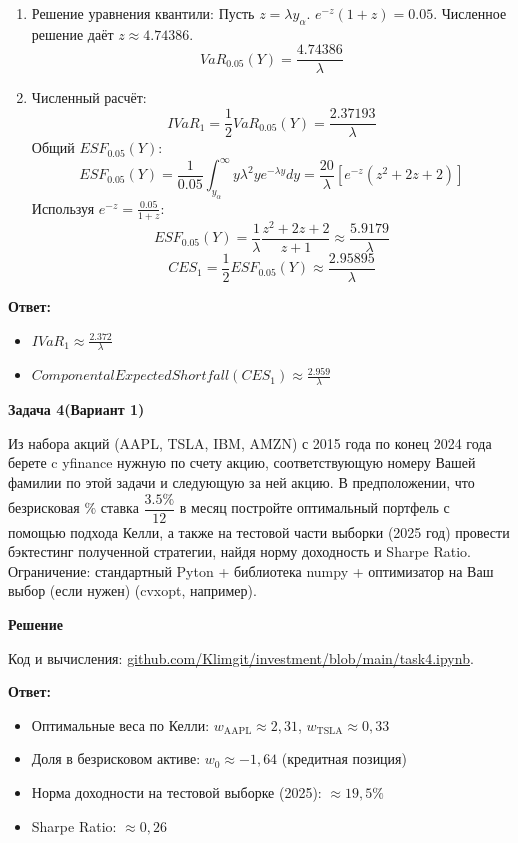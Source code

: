 \documentclass[a4paper,12pt]{extarticle}
\begin{document}
\begin{enumerate}
    \item Решение уравнения квантили:
    Пусть $z = \lambda y_{\alpha}$. $e^{-z}(1+z) = 0.05$. Численное решение даёт $z \approx 4.74386$.
    $$VaR_{0.05}(Y) = \frac{4.74386}{\lambda}$$

    \item Численный расчёт:
    $$IVaR_1 = \frac{1}{2}VaR_{0.05}(Y) = \frac{2.37193}{\lambda}$$
    Общий $ESF_{0.05}(Y)$:
    $$ESF_{0.05}(Y) = \frac{1}{0.05} \int_{y_{\alpha}}^{\infty} y \lambda^2 y e^{-\lambda y} dy = \frac{20}{\lambda} [e^{-z}(z^2+2z+2)]$$
    Используя $e^{-z} = \frac{0.05}{1+z}$:
    $$ESF_{0.05}(Y) = \frac{1}{\lambda} \frac{z^2+2z+2}{z+1} \approx \frac{5.9179}{\lambda}$$
    $$CES_1 = \frac{1}{2} ESF_{0.05}(Y) \approx \frac{2.95895}{\lambda}$$
\end{enumerate}

\textbf{Ответ:}
\begin{itemize}
    \item $IVaR_1 \approx \frac{2.372}{\lambda}$
    \item $Componental Expected Shortfall (CES_1) \approx \frac{2.959}{\lambda}$
\end{itemize}

\begin{center}
    \textbf{Задача 4(Вариант 1)}
\end{center}
Из набора акций (AAPL, TSLA, IBM, AMZN) с 2015 года по конец 2024 года берете c yfinance нужную по счету акцию, соответствующую номеру Вашей фамилии по этой задачи и следующую за ней акцию. В предположении, что безрисковая $\%$ ставка $\dfrac{3.5\%}{12}$ в месяц постройте оптимальный портфель с помощью подхода Келли, а также на тестовой части выборки (2025 год) провести бэктестинг полученной стратегии, найдя норму доходность и Sharpe Ratio. Ограничение: стандартный Pyton + библиотека numpy + оптимизатор на Ваш выбор (если нужен) (cvxopt, например).
\begin{center}
    \textbf{Решение}
\end{center}
Код и вычисления: \href{https://github.com/Klimgit/investment/blob/main/task4.ipynb}{github.com/Klimgit/investment/blob/main/task4.ipynb}.

\textbf{Ответ:}
\begin{itemize}
    \item Оптимальные веса по Келли: $w_{\mathrm{AAPL}} \approx 2{,}31$, $w_{\mathrm{TSLA}} \approx 0{,}33$
    \item Доля в безрисковом активе: $w_0 \approx -1{,}64$ (кредитная позиция)
    \item Норма доходности на тестовой выборке (2025): $\approx 19{,}5\%$
    \item Sharpe Ratio: $\approx 0{,}26$
\end{itemize}
\end{document}
